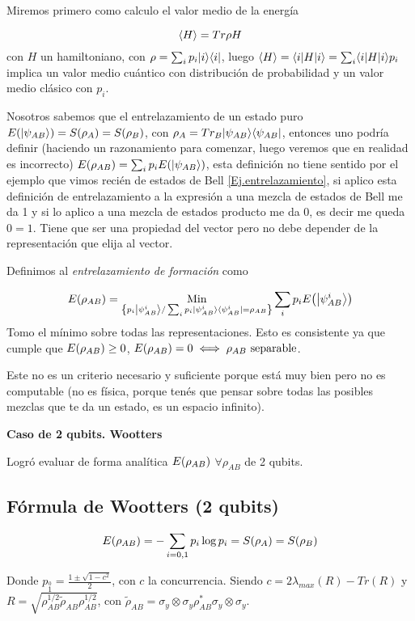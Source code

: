 Miremos primero como calculo el valor medio de la energía

\[
\VALMEDIO H=Tr\rho H
\]
con $H$ un hamiltoniano, con $\rho=\sum_{i}p_{i}|i \rangle\langle i|$, luego
$\VALMEDIO H=\EXPECT ii H=\sum_{i}\EXPECT ii H p_{i}$
implica un valor medio cuántico con distribución de probabilidad y
un valor medio clásico con $p_{i}$.

Nosotros sabemos que el entrelazamiento de un estado puro $E\PARENTESIS{\KET{\psi_{AB}}}=S\PARENTESIS{\rho_{A}}=S\PARENTESIS{\rho_{B}}$,
con $\rho_{A}=Tr_{B}|\psi_{AB} \rangle\langle \psi_{AB}|$, entonces uno
podría definir (haciendo un razonamiento para comenzar, luego veremos que en realidad es incorrecto)
 $E\PARENTESIS{\rho_{AB}}=\sum_{i}p_{i}E\PARENTESIS{\KET{\psi_{AB}}}$,
esta definición no tiene sentido por el ejemplo que vimos recién de estados
de Bell \ref{Ej.entrelazamiento}, si aplico esta definición de entrelazamiento a la expresión
a una mezcla de estados de Bell me da 1 y si lo aplico a una mezcla
de estados producto me da 0, es decir me queda $0=1$. Tiene que ser
una propiedad del vector pero no debe depender de la representación
que elija al vector. 

Definimos al \textit{entrelazamiento de formación} como

\[
E\PARENTESIS{\rho_{AB}}=\underset{\LLAVES{p_{i}\KET{\psi_{AB}^{i}}/\sum_{i}p_{i}\PROYECT{\psi_{AB}^{i}}{\psi_{AB}^{i}}=\rho_{AB}}}{\text{Min}}\sum_{i}p_{i}E\PARENTESIS{\KET{\psi_{AB}^{i}}}
\]
 Tomo el mínimo sobre todas las representaciones. Esto es consistente
ya que cumple que $E\PARENTESIS{\rho_{AB}}\ge0$, $E\PARENTESIS{\rho_{AB}}=0\iff\rho_{AB}\text{ separable}$. 

Este no es un criterio necesario y suficiente porque está muy bien
pero no es computable (no es física, porque tenés que pensar sobre
todas las posibles mezclas que te da un estado, es un espacio infinito). 

\textbf{Caso de 2 qubits. Wootters}

Logró evaluar de forma analítica $E\PARENTESIS{\rho_{AB}}$ $\forall\rho_{AB}$
de 2 qubits.

\subsection{Fórmula de Wootters (2 qubits) }

\[
E\PARENTESIS{\rho_{AB}}=-\sum_{i=0,1}p_{i}\log p_{i}=S\PARENTESIS{\rho_{A}}=S\PARENTESIS{\rho_{B}}
\]

Donde $p_{\overset{0}{1}}=\frac{1\pm\sqrt{1-c^{2}}}{2}$, con $c$
la concurrencia. Siendo $c=2\lambda_{max}(R)-Tr(R)$ y $R=\sqrt{\rho_{AB}^{1/2}\tilde{\rho}_{AB}\rho_{AB}^{1/2}}$,
con $\tilde{\rho}_{AB}=\sigma_{y}\otimes\sigma_{y}\rho_{AB}^{*}\sigma_{y}\otimes\sigma_{y}$. 

